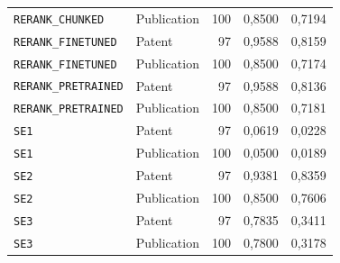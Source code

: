 \begin{longtable}{p{.34\linewidth}lrrr}
{\footnotesize\texttt{RERANK\_CHUNKED}} & Publication & 100 & 0,8500 & 0,7194 \\
{\footnotesize\texttt{RERANK\_FINETUNED}} & Patent & 97 & 0,9588 & 0,8159 \\
{\footnotesize\texttt{RERANK\_FINETUNED}} & Publication & 100 & 0,8500 & 0,7174 \\
{\footnotesize\texttt{RERANK\_PRETRAINED}} & Patent & 97 & 0,9588 & 0,8136 \\
{\footnotesize\texttt{RERANK\_PRETRAINED}} & Publication & 100 & 0,8500 & 0,7181 \\
{\footnotesize\texttt{SE1}} & Patent & 97 & 0,0619 & 0,0228 \\
{\footnotesize\texttt{SE1}} & Publication & 100 & 0,0500 & 0,0189 \\
{\footnotesize\texttt{SE2}} & Patent & 97 & 0,9381 & 0,8359 \\
{\footnotesize\texttt{SE2}} & Publication & 100 & 0,8500 & 0,7606 \\
{\footnotesize\texttt{SE3}} & Patent & 97 & 0,7835 & 0,3411 \\
{\footnotesize\texttt{SE3}} & Publication & 100 & 0,7800 & 0,3178 \\
\end{longtable}\endgroup
{}
